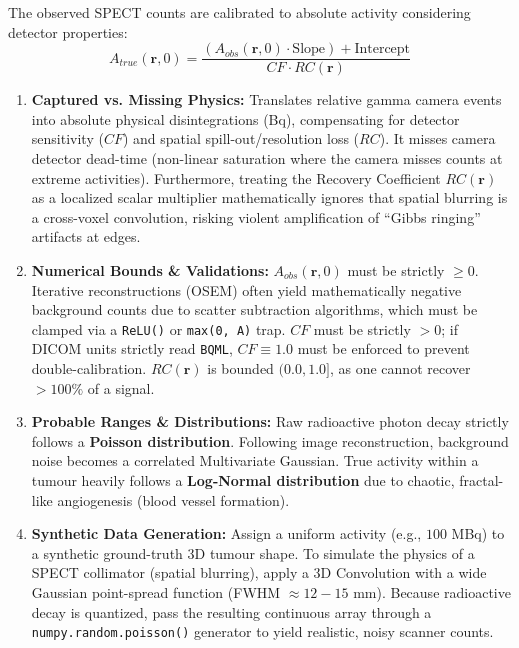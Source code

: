 \documentclass[11pt,a4paper]{article}
\begin{document}
The observed SPECT counts are calibrated to absolute activity considering detector properties:
\begin{equation}
    A_{true}(\mathbf{r}, 0) = \frac{(A_{obs}(\mathbf{r}, 0) \cdot \text{Slope}) + \text{Intercept}}{CF \cdot RC(\mathbf{r})}
\end{equation}

\begin{enumerate}
    \item \textbf{Captured vs. Missing Physics:} Translates relative gamma camera events into absolute physical disintegrations (Bq), compensating for detector sensitivity ($CF$) and spatial spill-out/resolution loss ($RC$). It misses camera detector dead-time (non-linear saturation where the camera misses counts at extreme activities). Furthermore, treating the Recovery Coefficient $RC(\mathbf{r})$ as a localized scalar multiplier mathematically ignores that spatial blurring is a cross-voxel convolution, risking violent amplification of ``Gibbs ringing'' artifacts at edges.
    \item \textbf{Numerical Bounds \& Validations:} $A_{obs}(\mathbf{r},0)$ must be strictly $\ge 0$. Iterative reconstructions (OSEM) often yield mathematically negative background counts due to scatter subtraction algorithms, which must be clamped via a \texttt{ReLU()} or \texttt{max(0, A)} trap. $CF$ must be strictly $> 0$; if DICOM units strictly read \texttt{BQML}, $CF \equiv 1.0$ must be enforced to prevent double-calibration. $RC(\mathbf{r})$ is bounded $(0.0, 1.0]$, as one cannot recover $>100\%$ of a signal.
    \item \textbf{Probable Ranges \& Distributions:} Raw radioactive photon decay strictly follows a \textbf{Poisson distribution}. Following image reconstruction, background noise becomes a correlated Multivariate Gaussian. True activity within a tumour heavily follows a \textbf{Log-Normal distribution} due to chaotic, fractal-like angiogenesis (blood vessel formation).
    \item \textbf{Synthetic Data Generation:} Assign a uniform activity (e.g., $100$ MBq) to a synthetic ground-truth 3D tumour shape. To simulate the physics of a SPECT collimator (spatial blurring), apply a 3D Convolution with a wide Gaussian point-spread function (FWHM $\approx 12-15$ mm). Because radioactive decay is quantized, pass the resulting continuous array through a \texttt{numpy.random.poisson()} generator to yield realistic, noisy scanner counts.
\end{enumerate}
\end{document}
